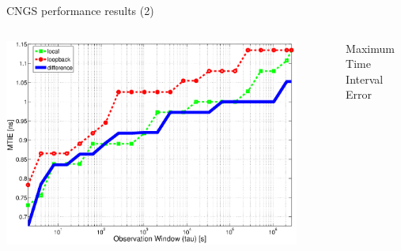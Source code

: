 \documentclass[compress,red]{beamer}
\begin{document}
\begin{frame}{CNGS performance results (2)}
\begin{columns}[c]
		\begin{center}
		\includegraphics[width=0.9\textwidth]{measurements/MTIE2.pdf}
		\end{center}
		\begin{center}
		Maximum Time Interval Error
		\end{center}
  \end{columns}
  \begin{columns}[c]

  \end{columns}

\end{frame}
\end{document}
